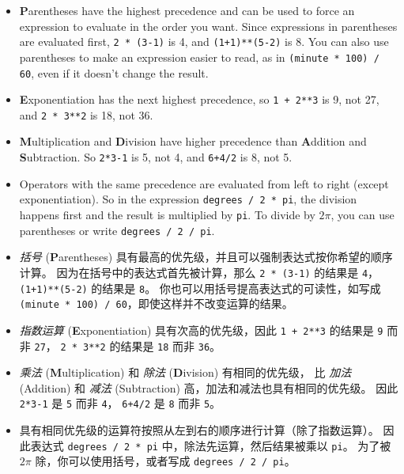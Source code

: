 \begin{itemize}

\item {\bf P}arentheses have the highest precedence and can be used
to force an expression to evaluate in the order you want. Since
expressions in parentheses are evaluated first, {\tt 2 * (3-1)} is 4,
and {\tt (1+1)**(5-2)} is 8. You can also use parentheses to make an
expression easier to read, as in {\tt (minute * 100) / 60}, even
if it doesn't change the result.

\item {\bf E}xponentiation has the next highest precedence, so
{\tt 1 + 2**3} is 9, not 27, and {\tt 2 * 3**2} is 18, not 36.

\item {\bf M}ultiplication and {\bf D}ivision have higher precedence
  than {\bf A}ddition and {\bf S}ubtraction.  So {\tt 2*3-1} is 5, not
  4, and {\tt 6+4/2} is 8, not 5.

\item Operators with the same precedence are evaluated from left to
  right (except exponentiation).  So in the expression {\tt degrees /
    2 * pi}, the division happens first and the result is multiplied
  by {\tt pi}.  To divide by $2 \pi$, you can use parentheses or write
  {\tt degrees / 2 / pi}.

\end{itemize}

\begin{itemize}

\item \emph{括号} (\textbf{P}arentheses) 具有最高的优先级，并且可以强制表达式按你希望的顺序计算。 因为在括号中的表达式首先被计算，那么 \lstinline{2 * (3-1)} 的结果是 \lstinline{4}，\lstinline{(1+1)**(5-2)} 的结果是 \lstinline{8}。 你也可以用括号提高表达式的可读性，如写成 \lstinline{(minute * 100) / 60}，即使这样并不改变运算的结果。

\item \emph{指数运算} (\textbf{E}xponentiation) 具有次高的优先级，因此 \lstinline{1 + 2**3} 的结果是 \lstinline{9} 而非 \lstinline{27}， \lstinline{2 * 3**2} 的结果是 \lstinline{18} 而非 \lstinline{36}。

\item \emph{乘法} (\textbf{M}ultiplication) 和 \emph{除法} (\textbf{D}ivision) 有相同的优先级， 比 \emph{加法} (Addition) 和 \emph{减法} (Subtraction) 高，加法和减法也具有相同的优先级。 因此 \lstinline{2*3-1} 是 \lstinline{5} 而非 \lstinline{4}， \lstinline{6+4/2} 是 \lstinline{8} 而非 \lstinline{5}。

\item 具有相同优先级的运算符按照从左到右的顺序进行计算（除了指数运算）。 因此表达式 \lstinline{degrees / 2 * pi} 中，除法先运算，然后结果被乘以 \lstinline{pi}。 为了被 $2\pi$ 除，你可以使用括号，或者写成 \lstinline{degrees / 2 / pi}。

\end{itemize}


